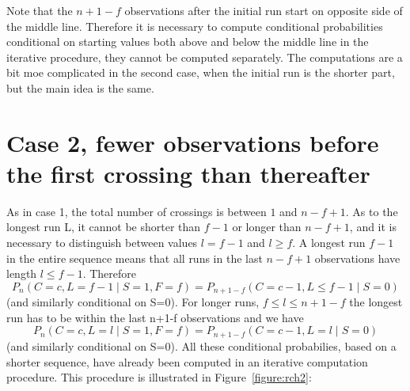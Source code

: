 Note that the $n+1-f$ observations after the initial run start on opposite side of the middle line. Therefore it is necessary to compute conditional probabilities conditional on starting values both above and below the middle line in the iterative procedure, they cannot be computed separately. The computations are a bit moe complicated in the second case, when the initial run is the shorter part, but the main idea is the same.

\section{Case 2, fewer observations before the first crossing than thereafter}

As in case 1, the total number of crossings is between $1$ and $n-f+1$. As to the longest run L, it cannot be shorter than $f-1$ or longer than $n-f+1$, and it is necessary to distinguish between values $l=f-1$ and $l \geq f$. A longest run $f-1$ in the entire sequence means that all runs in the last $n-f+1$ observations have length $l \leq f-1$. Therefore $$P_n (C=c,L=f-1 \mid S=1,F=f) = P_{n+1-f} (C=c-1,L \leq f-1 \mid S=0)$$
(and similarly conditional on S=0). For longer runs, $f \leq l \leq n+1-f$ the longest run has to be within the last n+1-f observations and we have $$P_n (C=c,L=l \mid S=1,F=f) = P_{n+1-f} (C=c-1,L=l \mid S=0)$$
(and similarly conditional on S=0). All these conditional probabilies, based on a shorter sequence, have already been computed in an iterative computation procedure. This procedure is illustrated in Figure~\ref{figure:rch2}:

